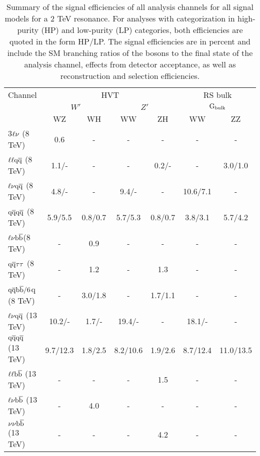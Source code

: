 \begin{table}[!htb]
  \centering
  \caption{Summary of the signal efficiencies of all analysis channels for all signal models for a 2 TeV resonance.
For analyses with categorization in high-purity (HP) and low-purity (LP) categories, both efficiencies are quoted in the form HP/LP.
The signal efficiencies are in percent and include the SM branching ratios of the bosons to the final state of the analysis channel,
effects from detector acceptance, as well as reconstruction and selection efficiencies.
}
  \begin{tabular}{l|c c|c c|c c}
    \hline
 Channel & \multicolumn{4}{c|}{HVT} & \multicolumn{2}{c}{RS bulk} \\
  & \multicolumn{2}{c|}{$W'$} & \multicolumn{2}{c|}{$Z'$} & \multicolumn{2}{c}{$\rm G_{bulk}$} \\
  & WZ & WH & WW & ZH & WW & ZZ \\
    \hline
 3$\ell\nu$ (8 TeV) & 0.6 & - & - & - & - & -\\   
 $\ell\ell \mathrm{q}\overline{\mathrm{q}}$ (8 TeV) &  1.1/- &  - &  - &  0.2/- &  - &  3.0/1.0\\
 $\ell \nu \mathrm{q}\overline{\mathrm{q}}$ (8 TeV) &  4.8/- &  - &  9.4/- &  - &  10.6/7.1 &  -\\
 $\mathrm{q}\overline{\mathrm{q}} \mathrm{q}\overline{\mathrm{q}}$ (8 TeV) &  5.9/5.5 &  0.8/0.7 &  5.7/5.3 & 0.8/0.7 &  3.8/3.1 &  5.7/4.2\\
    \hline
 $\ell \nu {\mathrm{b}\overline{\mathrm{b}}}$(8 TeV) &  - &  0.9 &  - &  - &  - &  -\\
 $\mathrm{q}\overline{\mathrm{q}} \tau\tau$ (8 TeV)  &  - &  1.2 &  - &  1.3 &  - &  -\\
 $\mathrm{q}\overline{\mathrm{q}}{\mathrm{b}\overline{\mathrm{b}}}/6$q (8 TeV) &  - &  3.0/1.8 &  - &  1.7/1.1 &  - &  -\\
    \hline
 $\ell \nu \mathrm{q}\overline{\mathrm{q}}$ (13 TeV) &  10.2/- &  1.7/- &  19.4/- &  - &  18.1/- &  -\\
 $\mathrm{q}\overline{\mathrm{q}} \mathrm{q}\overline{\mathrm{q}}$ (13 TeV) &  9.7/12.3 &  1.8/2.5 &  8.2/10.6 & 1.9/2.6 &  8.7/12.4 &  11.0/13.5\\
    \hline
 $\ell\ell{\mathrm{b}\overline{\mathrm{b}}}$ (13 TeV) &  - &  - &  - &  1.5 &  - &  -\\
 $\ell\nu{\mathrm{b}\overline{\mathrm{b}}}$ (13 TeV) &  - &  4.0 &  - &  - &  - &  -\\
 $\nu\nu{\mathrm{b}\overline{\mathrm{b}}}$ (13 TeV)  &  - &  - &  - &  4.2 &  - &  -\\
   \hline
  \end{tabular}
  \label{tab:efficiencies}
\end{table}

